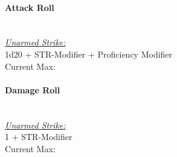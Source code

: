 \documentclass[letterpaper,openany,oneside,twocolumn]{book}
\newcommand{\PATH}{../../}
\begin{document}
\paragraph*{Attack Roll}\hfill\\
\underline{\textit{Unarmed Strike:}}\\
1d20 + STR-Modifier + Proficiency Modifier\\
\indent Current Max: 
\paragraph*{Damage Roll}\hfill\\
\underline{\textit{Unarmed Strike:}}\\
1 + STR-Modifier\\
\indent Current Max: 


\end{document}
